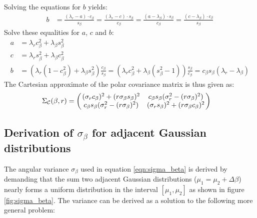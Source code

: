 Solving the equations for $b$ yields:
\begin{align*}
	b &= \frac{(\lambda_r - a)  \cdot c_\beta}{s_\beta}
	= \frac{(\lambda_r - c)  \cdot s_\beta}{c_\beta}
	= \frac{(a - \lambda_\beta) \cdot s_ \beta}{c_\beta}
	= \frac{(c - \lambda_\beta) \cdot c_\beta}{s_\beta}
\end{align*}
Solve these equalities for $a$, $c$ and $b$:
\begin{align*}
	a &= \lambda_r c_\beta^2 + \lambda_\beta s_\beta^2 \\
	c &= \lambda_r s_\beta^2 + \lambda_\beta c_\beta^2 \\
	b &= \left(\lambda_r (1 - c_\beta^2) + \lambda_\beta s_\beta^2 \right) \frac{c_\beta}{s_\beta}
	  = \left(\lambda_r c_\beta^2 + \lambda_\beta (s_\beta^2 - 1) \right) \frac{s_\beta}{c_\beta}
	  = c_\beta s_\beta (\lambda_r - \lambda_\beta)
\end{align*}
The Cartesian approximate of the polar covariance matrix is thus given as:
\begin{align*}
	\Sigma_{\mathcal{C}}(\beta, r) &= \left( \left. \begin{matrix}
	    (\sigma_r c_\beta)^2 + (r \sigma_\beta s_\beta)^2 & c_\beta s_\beta (\sigma_r^2 - (r \sigma_\beta)^2) \\
	    c_\beta s_\beta (\sigma_r^2 - (r \sigma_\beta)^2) & (\sigma_r s_\beta)^2 + (r \sigma_\beta c_\beta)^2
	\end{matrix}\right. \right)
\end{align*}


\subsection{Derivation of $\sigma_\beta$ for adjacent Gaussian distributions}

\label{proof:sigma_beta}

The angular variance $\sigma_\beta$ used in equation \ref{eqn:sigma_beta} is derived by demanding that the sum two adjacent Gaussian distributions ($\mu_1 = \mu_2 + \Delta \beta$) nearly forms a uniform distribution in the interval $[\mu_1, \mu_2]$ as shown in figure \ref{fig:sigma_beta}. The variance can be derived as a solution to the following more general problem:

